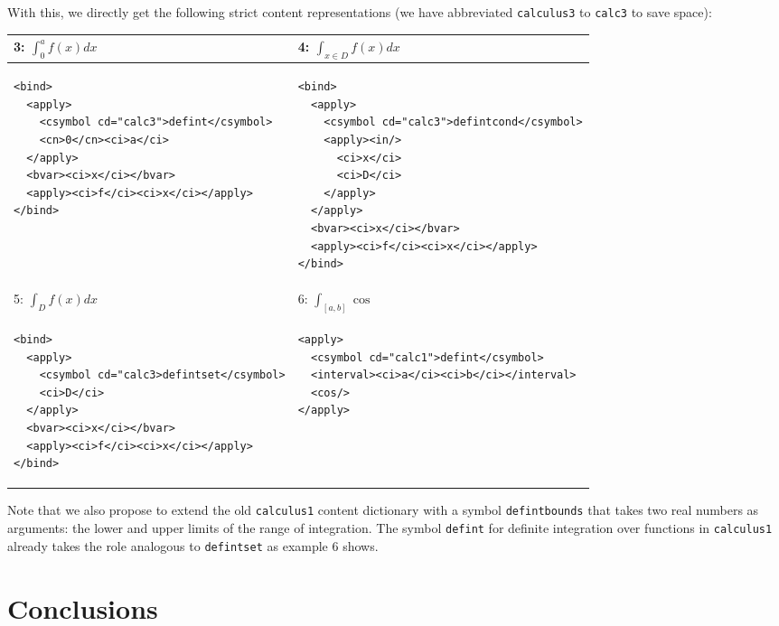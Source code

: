 \documentclass{llncs}
\begin{document}
With this, we directly get the following strict content {\mathml} representations (we have
abbreviated {\texttt{calculus3}} to {\texttt{calc3}} to save space):
\begin{center}\lstset{frame=none,numbers=none,lineskip=-.7ex,aboveskip=-.5em,belowskip=-1em,language=MathML2}\begin{tabular}{|p{7.5cm}|p{7.8cm}|}\hline
  3: $\int_0^af(x) dx$ & 4: $\int_{x\in D}f(x) dx$ \\\hline
\begin{lstlisting}
<bind>
  <apply>
    <csymbol cd="calc3">defint</csymbol>
    <cn>0</cn><ci>a</ci>
  </apply>
  <bvar><ci>x</ci></bvar>
  <apply><ci>f</ci><ci>x</ci></apply>
</bind>
\end{lstlisting}
&
\begin{lstlisting}
<bind>
  <apply>
    <csymbol cd="calc3">defintcond</csymbol>
    <apply><in/>
      <ci>x</ci>
      <ci>D</ci>
    </apply>
  </apply>
  <bvar><ci>x</ci></bvar>
  <apply><ci>f</ci><ci>x</ci></apply>
</bind>
\end{lstlisting}
\\\hline\hline
 5: $\int_Df(x)dx$ & 6: $\int_{[a,b]}\cos$\\\hline
\begin{lstlisting}
<bind>
  <apply>
    <csymbol cd="calc3>defintset</csymbol>
    <ci>D</ci>
  </apply>
  <bvar><ci>x</ci></bvar>
  <apply><ci>f</ci><ci>x</ci></apply>
</bind>
\end{lstlisting}
& 
\begin{lstlisting}
<apply>
  <csymbol cd="calc1">defint</csymbol>
  <interval><ci>a</ci><ci>b</ci></interval>
  <cos/>
</apply>
\end{lstlisting}
\\\hline
\end{tabular}
\end{center}

Note that we also propose to extend the old {\texttt{calculus1}} content dictionary with a
symbol {\texttt{defintbounds}} that takes two real numbers as arguments: the lower and
upper limits of the range of integration. The symbol {\texttt{defint}} for definite
integration over functions in {\texttt{calculus1}} already takes the role analogous to
{\texttt{{defintset}}} as example 6 shows. 

\section{Conclusions}
\end{document}
